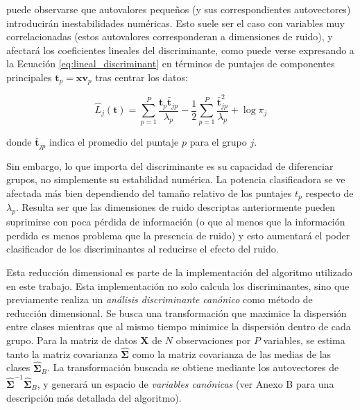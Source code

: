 \documentclass[12pt]{article}
\begin{document}
puede observarse que autovalores pequeños (y sus correspondientes autovectores) introducirán inestabilidades numéricas. Esto suele ser el caso con variables muy correlacionadas (estos autovalores corresponderan a dimensiones de ruido), y afectará los coeficientes lineales del discriminante, como puede verse expresando a la Ecuación \ref{eq:lineal_discriminant} en términos de puntajes de componentes principales $\mathbf{t}_p = \mathbf{x} \mathbf{v}_p$ tras centrar los datos:

\begin{equation} \label{eq:score_space}
\hat{L}_j (\mathbf{t}) = \sum_{p = 1}^{P} \frac{\mathbf{t}_p \bar{\mathbf{t}}_{jp}}{\lambda_p} - \frac{1}{2}\sum_{p = 1}^{P} \frac{\bar{\mathbf{t}}_{jp}^2}{\lambda_p} + \log \pi_j
\end{equation}

donde $\bar{\mathbf{t}}_{jp}$ indica el promedio del puntaje $p$ para el grupo $j$.

Sin embargo, lo que importa del discriminante es su capacidad de diferenciar grupos, no simplemente su estabilidad numérica. La potencia clasificadora se ve afectada más bien dependiendo del tamaño relativo de los puntajes $t_p$ respecto de $\lambda_p$. Resulta ser que las dimensiones de ruido descriptas anteriormente pueden suprimirse con poca pérdida de información (o que al menos que la información perdida es menos problema que la presencia de ruido) y esto aumentará el poder clasificador de los discriminantes al reducirse el efecto del ruido.

Esta reducción dimensional es parte de la implementación del algoritmo utilizado en este trabajo. Esta implementación no solo calcula los discriminantes, sino que previamente realiza un \textit{análisis discriminante canónico} como método de reducción dimensional. Se busca una transformación que maximice la dispersión entre clases mientras que al mismo tiempo minimice la dispersión dentro de cada grupo. Para la matriz de datos $\mathbf{X}$ de $N$ observaciones por $P$ variables, se estima tanto la matriz covarianza $\hat{\boldsymbol{\Sigma}}$ como la matriz covarianza de las medias de las clases $\hat{\boldsymbol{\Sigma}}_B$. La transformación buscada se obtiene mediante los autovectores de $\hat{\boldsymbol{\Sigma}}^{-1}\hat{\boldsymbol{\Sigma}}_B$, y generará un espacio de 
\textit{variables canónicas} (ver Anexo B para una descripción más detallada del algoritmo). 
\end{document}
